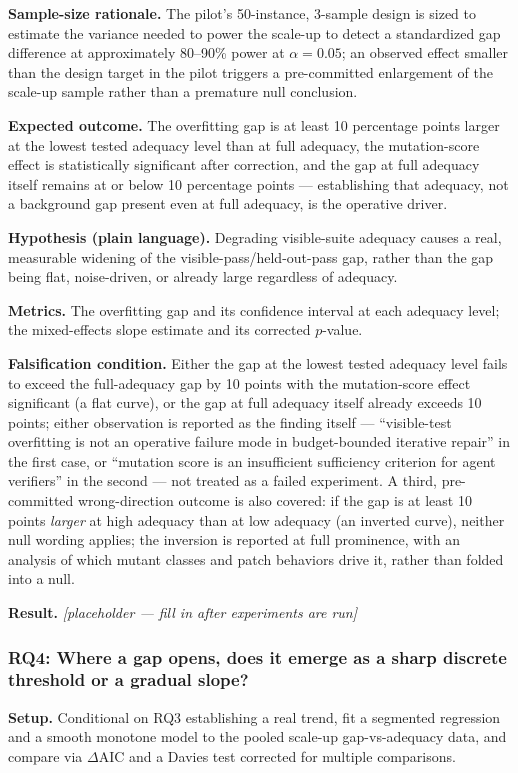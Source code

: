 \documentclass[11pt]{article}
\newcommand{\ph}{\textit{[placeholder --- fill in after experiments are run]}}
\begin{document}
\textbf{Sample-size rationale.} The pilot's 50-instance, 3-sample design is sized to estimate the variance needed to power the scale-up to detect a standardized gap difference at approximately 80--90\% power at $\alpha = 0.05$; an observed effect smaller than the design target in the pilot triggers a pre-committed enlargement of the scale-up sample rather than a premature null conclusion.

\textbf{Expected outcome.} The overfitting gap is at least 10 percentage points larger at the lowest tested adequacy level than at full adequacy, the mutation-score effect is statistically significant after correction, and the gap at full adequacy itself remains at or below 10 percentage points --- establishing that adequacy, not a background gap present even at full adequacy, is the operative driver.

\textbf{Hypothesis (plain language).} Degrading visible-suite adequacy causes a real, measurable widening of the visible-pass/held-out-pass gap, rather than the gap being flat, noise-driven, or already large regardless of adequacy.

\textbf{Metrics.} The overfitting gap and its confidence interval at each adequacy level; the mixed-effects slope estimate and its corrected $p$-value.

\textbf{Falsification condition.} Either the gap at the lowest tested adequacy level fails to exceed the full-adequacy gap by 10 points with the mutation-score effect significant (a flat curve), or the gap at full adequacy itself already exceeds 10 points; either observation is reported as the finding itself --- ``visible-test overfitting is not an operative failure mode in budget-bounded iterative repair'' in the first case, or ``mutation score is an insufficient sufficiency criterion for agent verifiers'' in the second --- not treated as a failed experiment. A third, pre-committed wrong-direction outcome is also covered: if the gap is at least 10 points \emph{larger} at high adequacy than at low adequacy (an inverted curve), neither null wording applies; the inversion is reported at full prominence, with an analysis of which mutant classes and patch behaviors drive it, rather than folded into a null.

\textbf{Result.} \ph

\subsubsection{RQ4: Where a gap opens, does it emerge as a sharp discrete threshold or a gradual slope?}
\textbf{Setup.} Conditional on RQ3 establishing a real trend, fit a segmented regression and a smooth monotone model to the pooled scale-up gap-vs-adequacy data, and compare via $\Delta$AIC and a Davies test corrected for multiple comparisons.
\end{document}
